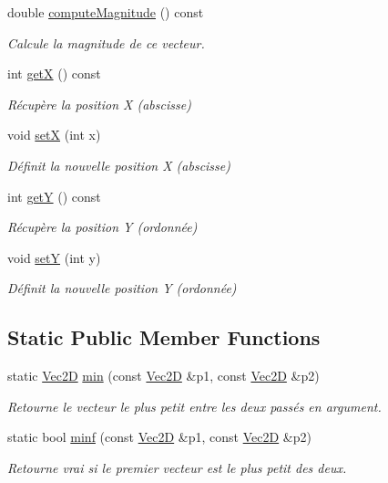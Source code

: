 \begin{DoxyCompactItemize}
double \hyperlink{classns_graphics_1_1_vec2_d_adf603dcb6f44ff82f3d48df141e11fe7}{compute\+Magnitude} () const
\begin{DoxyCompactList}\small\item\em Calcule la magnitude de ce vecteur. \end{DoxyCompactList}\item 
int \hyperlink{classns_graphics_1_1_vec2_d_abcf3d729b05b3cd93e9eff21c74b89a1}{getX} () const
\begin{DoxyCompactList}\small\item\em Récupère la position X (abscisse) \end{DoxyCompactList}\item 
void \hyperlink{classns_graphics_1_1_vec2_d_ae9d371fdd3817c6e9a3a1ae6ed3fd17d}{setX} (int x)
\begin{DoxyCompactList}\small\item\em Définit la nouvelle position X (abscisse) \end{DoxyCompactList}\item 
int \hyperlink{classns_graphics_1_1_vec2_d_ae70fbda9cca27b9dc0fe068a38ae5e5e}{getY} () const
\begin{DoxyCompactList}\small\item\em Récupère la position Y (ordonnée) \end{DoxyCompactList}\item 
void \hyperlink{classns_graphics_1_1_vec2_d_ac0e752e399ab2f727fe2644540b1208f}{setY} (int y)
\begin{DoxyCompactList}\small\item\em Définit la nouvelle position Y (ordonnée) \end{DoxyCompactList}\end{DoxyCompactItemize}
\subsection*{Static Public Member Functions}
\begin{DoxyCompactItemize}
\item 
static \hyperlink{classns_graphics_1_1_vec2_d}{Vec2D} \hyperlink{classns_graphics_1_1_vec2_d_a8a4760c6a33beb77d1e7a850b44129fc}{min} (const \hyperlink{classns_graphics_1_1_vec2_d}{Vec2D} \&p1, const \hyperlink{classns_graphics_1_1_vec2_d}{Vec2D} \&p2)
\begin{DoxyCompactList}\small\item\em Retourne le vecteur le plus petit entre les deux passés en argument. \end{DoxyCompactList}\item 
static bool \hyperlink{classns_graphics_1_1_vec2_d_a77c8619c34dcb2e7b5d9337da0fcfe59}{minf} (const \hyperlink{classns_graphics_1_1_vec2_d}{Vec2D} \&p1, const \hyperlink{classns_graphics_1_1_vec2_d}{Vec2D} \&p2)
\begin{DoxyCompactList}\small\item\em Retourne vrai si le premier vecteur est le plus petit des deux. \end{DoxyCompactList}\end{DoxyCompactItemize}

